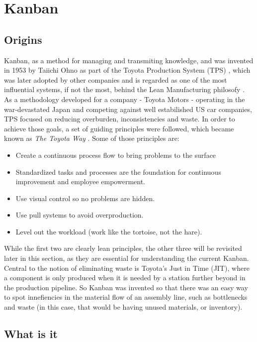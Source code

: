 \documentclass[conference]{IEEEtran}
\begin{document}
\section{Kanban}
\subsection{Origins}
Kanban, as a method for managing and transmiting knowledge, and was invented in 1953
by Taiichi Ohno as part of the Toyota Production System (TPS) \cite{kanban_orig}, which was later
adopted by other companies and is regarded as one of the most influential systems,
if not the most, behind the Lean Manufacturing philosofy \cite{kanban_orig2}\cite{kanban_orig3}. As a methodology
developed for a company - Toyota Motors - operating in the war-devastated Japan
and competing against well estabilished US car companies, TPS focused on reducing
overburden, inconsistencies and waste. In order to achieve those goals, a set of
guiding principles were followed, which became known as \textit{The Toyota Way} \cite{tps}\cite{tps2}. Some of those
principles are:

\begin{itemize}
  \item Create a continuous process flow to bring problems to the surface
  \item Standardized tasks and processes are the foundation for continuous
  improvement and employee empowerment.
  \item Use visual control so no problems are hidden.
  \item Use pull systems to avoid overproduction.
  \item Level out the workload (work like the tortoise, not the hare).
\end{itemize}

While the first two are clearly lean principles, the other three will be revisited
later in this section, as they are essential for understanding the current Kanban.
Central to the notion of eliminating waste is Toyota's
Just in Time (JIT), where a component is only produced when it is needed by
a station further beyond in the production pipeline. So Kanban was invented so that
there was an easy way to spot innefiencies in the material flow of an assembly
line, such as bottlenecks and waste (in this case, that would be having unused
materials, or inventory).

\subsection{What is it}
\label{whatis}
\end{document}
